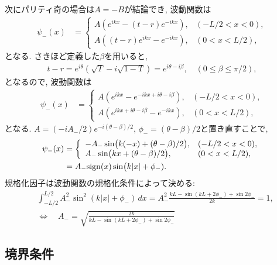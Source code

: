 \documentclass[10pt,a4j]{jarticle}
\begin{document}
次にパリティ奇の場合は$A=-B$が結論でき, 波動関数は
\begin{align}
\psi_{-}(x) &= \left\{ \begin{array}{ll} A (e^{ik x} - (t-r) e^{-ik x}), & (-L/2 < x<0), \\
A ((t-r) e^{ik x} - e^{-ik x} ), & (0<x<L/2), \end{array} \right.
\end{align}
となる. さきほど定義した$\beta$を用いると, 
\begin{align}
t - r = e^{i \theta} (\sqrt{T} - i \sqrt{1-T}) = e^{i\theta - i \beta}, \quad (0 \le \beta \le \pi/2),
\end{align}
となるので, 波動関数は
\begin{align}
\psi_{-}(x) &= \left\{ \begin{array}{ll} A (e^{ik x} - e^{-ik x + i \theta - i\beta}), & (-L/2 < x<0), \\
A (e^{ik x + i\theta - i\beta} - e^{-ik x} ), & (0<x<L/2), \end{array} \right.
\end{align}
となる. $A=(-i A_-/2) e^{-i(\theta - \beta)/2}$, $\phi_- = (\theta-\beta)/2$と置き直すことで, 
\begin{align}
\psi_{-}(x) &= \left\{ \begin{array}{ll} - A_-  \sin \bigl( k(-x) + (\theta - \beta)/2\bigr), & (-L/2 < x<0), \\
A_- \sin \bigl( k x + (\theta - \beta)/2\bigr), & (0<x<L/2), \\ \end{array} \right. \\
& = A_- {\rm sign}(x) \sin \bigl( k|x| + \phi_-).
\end{align}
規格化因子は波動関数の規格化条件によって決める:
\begin{align}
& \int_{-L/2}^{L/2}  A_-^2 \sin^2(k|x|+\phi_-) \, dx
= A_-^2 \frac{k L - \sin (kL + 2\phi_-)+ \sin 2\phi_-}{2 k} = 1, \\
& \Longleftrightarrow \quad A_- = \sqrt{\frac{2k}{k L - \sin(k L + 2\phi_-) + \sin 2\phi_- }}
\end{align}

\subsection{境界条件}
\end{document}
